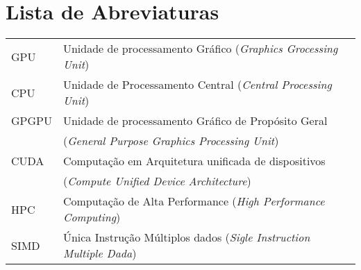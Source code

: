 \documentclass[12pt,twoside,a4paper]{book}
\renewcommand{\chaptermark}[1]{\markboth{\MakeUppercase{#1}}{}}
\begin{document}
\chapter{Lista de Abreviaturas}
\begin{tabular}{ll}
  GPU   & Unidade de processamento Gráfico (\emph{Graphics Grocessing Unit})\\

  CPU   & Unidade de Processamento Central (\emph{Central Processing Unit})\\

  GPGPU & Unidade de processamento Gráfico de Propósito Geral\\
        & (\emph{General Purpose Graphics Processing Unit})\\

  CUDA  & Computação em Arquitetura unificada de dispositivos\\
        & (\emph{Compute Unified Device Architecture})\\

  HPC   & Computação de Alta Performance (\emph{High Performance Computing})\\

  SIMD  & Única Instrução Múltiplos dados (\emph{Sigle Instruction Multiple Dada})\\
\end{tabular}

\mainmatter

\fancyhead[RE,LO]{\thesection}

\onehalfspacing            %








\renewcommand{\chaptermark}[1]{\markboth{\MakeUppercase{\appendixname\ \thechapter}} {\MakeUppercase{#1}} }
\fancyhead[RE,LO]{}
\appendix



\backmatter \singlespacing   %



\end{document}
